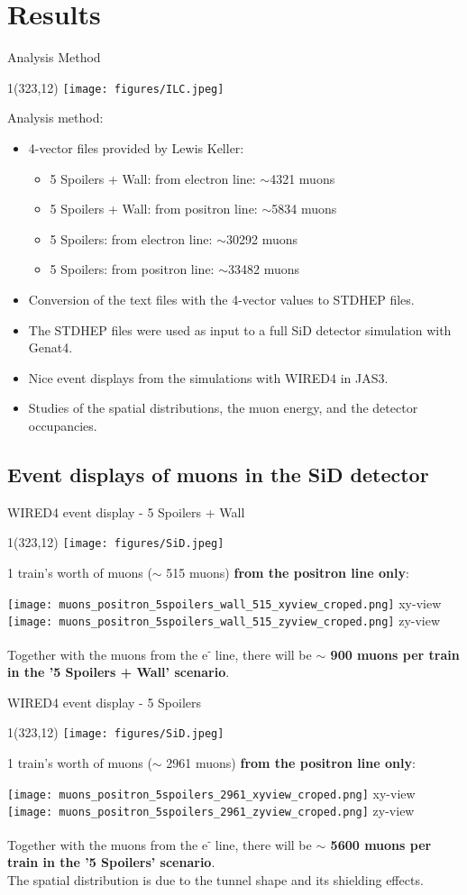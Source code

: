 \documentclass[xcolor={dvipsnames}]{beamer}
\newcommand{\sidlogo}{
  \setlength{\TPHorizModule}{1pt}
  \setlength{\TPVertModule}{1pt}
  \begin{textblock}{1}(323,12)
   \texttt{[image: figures/SiD.jpeg]}
  \end{textblock}
  }
\newcommand{\ilclogo}{
  \setlength{\TPHorizModule}{1pt}
  \setlength{\TPVertModule}{1pt}
  \begin{textblock}{1}(323,12)
   \texttt{[image: figures/ILC.jpeg]}
  \end{textblock}
}
\begin{document}
\section{Results}
\begin{frame}{Analysis Method}
\ilclogo
Analysis method:
\begin{itemize}
\item 4-vector files provided by Lewis Keller:
\begin{itemize}
 \item 5 Spoilers + Wall: from electron line: $\sim$4321 muons
 \item 5 Spoilers + Wall: from positron line: $\sim$5834 muons
 \item 5 Spoilers: from electron line: $\sim$30292 muons
 \item 5 Spoilers: from positron line: $\sim$33482 muons
\end{itemize}
\item Conversion of the text files with the 4-vector values to  STDHEP files.
\item The STDHEP files were used as input to a full SiD detector simulation with Genat4.
\item Nice event displays from the simulations with WIRED4 in JAS3.
\item Studies of the spatial distributions, the muon energy, and the detector occupancies.
\end{itemize}

\end{frame}

\subsection{Event displays of muons in the SiD detector}
\begin{frame}{WIRED4 event display - 5 Spoilers + Wall}
\sidlogo
1 train's worth of muons ($\sim$ 515 muons) \textbf{from the positron line only}:
\begin{center}
\texttt{[image: muons\_positron\_5spoilers\_wall\_515\_xyview\_croped.png]}
{\tiny xy-view}
\texttt{[image: muons\_positron\_5spoilers\_wall\_515\_zyview\_croped.png]}
{\tiny zy-view}
\end{center}
Together with the muons from the e\textsuperscript{-} line, there will be \textbf{$\sim$ 900 muons per train in the '5 Spoilers + Wall' scenario}.
\end{frame}
\begin{frame}{WIRED4 event display - 5 Spoilers}
\sidlogo
1 train's worth of muons ($\sim$ 2961 muons) \textbf{from the positron line only}:
\begin{center}
\texttt{[image: muons\_positron\_5spoilers\_2961\_xyview\_croped.png]}
{\tiny xy-view}
\texttt{[image: muons\_positron\_5spoilers\_2961\_zyview\_croped.png]}
{\tiny zy-view}
\end{center}
Together with the muons from the e\textsuperscript{-} line, there will be \textbf{$\sim$ 5600 muons per train in the '5 Spoilers' scenario}.\\
The spatial distribution is due to the tunnel shape and its shielding effects.
\end{frame}
\end{document}
